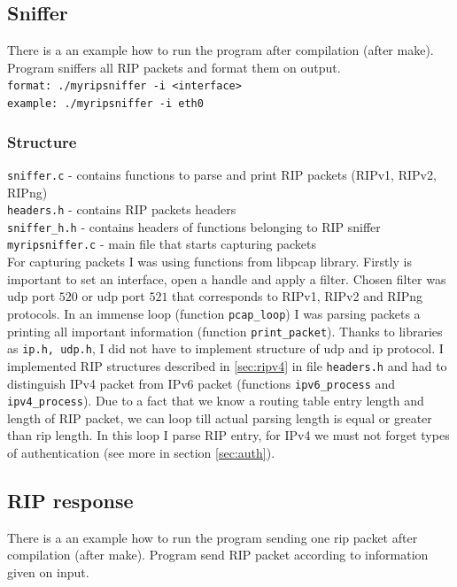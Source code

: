 \documentclass[11pt,a4paper]{article}
\begin{document}
\subsection{Sniffer}
There is a an example how to run the program after compilation (after make). Program sniffers all RIP packets and format them on output.\\

\noindent
\texttt{format: ./myripsniffer -i <interface>}\\
\texttt{example: ./myripsniffer -i eth0}

\subsubsection{Structure}
\texttt{sniffer.c} - contains functions to parse and print RIP packets (RIPv1, RIPv2, RIPng)\\
\texttt{headers.h} - contains RIP packets headers\\
\texttt{sniffer\_h.h} - contains headers of functions belonging to RIP sniffer\\
\texttt{myripsniffer.c} - main file that starts capturing packets\\

\noindent
For capturing packets I was using functions from libpcap library. Firstly is important to set an interface, open a handle and apply a filter. Chosen filter was udp port $520$ or udp port $521$ that corresponds to RIPv1, RIPv2 and RIPng protocols. In an immense loop (function \texttt{pcap\_loop}) I was parsing packets a printing all important information (function \texttt{print\_packet}). Thanks to libraries as \texttt{ip.h, udp.h}, I did not have to implement structure of udp and ip protocol. I implemented RIP structures described in \ref{sec:ripv4} in file \texttt{headers.h} and had to distinguish IPv4 packet from IPv6 packet (functions \texttt{ipv6\_process} and \texttt{ipv4\_process}). Due to a fact that we know a routing table entry length and length of RIP packet, we can loop till actual parsing length is equal or greater than rip length. In this loop I parse RIP entry, for IPv4 we must not forget types of authentication (see more in section \ref{sec:auth}).

\subsection{RIP response}
There is a an example how to run the program sending one rip packet after compilation (after make). Program send RIP packet according to information given on input.\\
\end{document}
